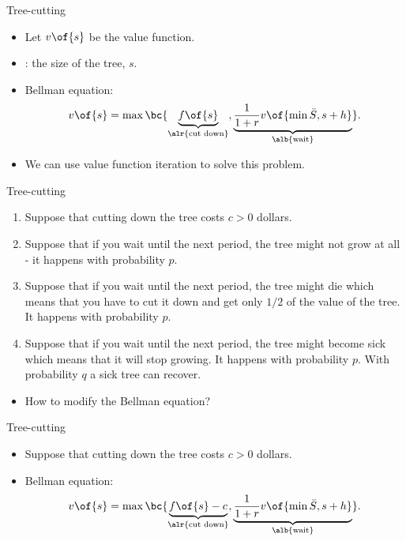 \documentclass[11pt,xcolor={dvipsnames},aspectratio=159,hyperref={pdftex,pdfpagemode=UseNone,hidelinks,pdfdisplaydoctitle=true},usepdftitle=false]{beamer}
\begin{document}
\begin{frame}{Tree-cutting}   
    \begin{itemize}
    \item Let $v\of{s}$ be the value function. 
    \item {}: the size of the tree, $s$.
    \item Bellman equation: \begin{align*}
        v\of{s} = \max\bc{\underbrace{f\of{s}}_{\alr{\text{cut down}}}, \underbrace{\frac{1}{1+r} v\of{\min{\bar{S},s+h}}}_{\alb{\text{wait}}}}.
    \end{align*}
    \item We can use value function iteration to solve this problem. 
    \end{itemize}
\end{frame}


\begin{frame}{Tree-cutting}   
    \begin{enumerate}
    \item Suppose that cutting down the tree costs $c>0$ dollars. 
    \item Suppose that if you wait until the next period, the tree might not grow at all - it happens with probability $p$.
    \item Suppose that if you wait until the next period, the tree might die which means that you have to cut it down and get only $1/2$ of the value of the tree. It happens with probability $p$.
    \item Suppose that if you wait until the next period, the tree might become sick which means that it will stop growing. It happens with probability $p$. With probability $q$ a sick tree can recover. 
    \end{enumerate}
    \begin{itemize}
    \item How to modify the Bellman equation? 
    \end{itemize}
\end{frame}


\begin{frame}{Tree-cutting}   
    \begin{itemize}
    \item Suppose that cutting down the tree costs $c>0$ dollars. 
    \item Bellman equation: \begin{align*}
        v\of{s} = \max\bc{\underbrace{f\of{s} - c}_{\alr{\text{cut down}}}, \underbrace{\frac{1}{1+r} v\of{\min{\bar{S},s+h}}}_{\alb{\text{wait}}}}.
    \end{align*}
    \end{itemize}
\end{frame}
\end{document}

